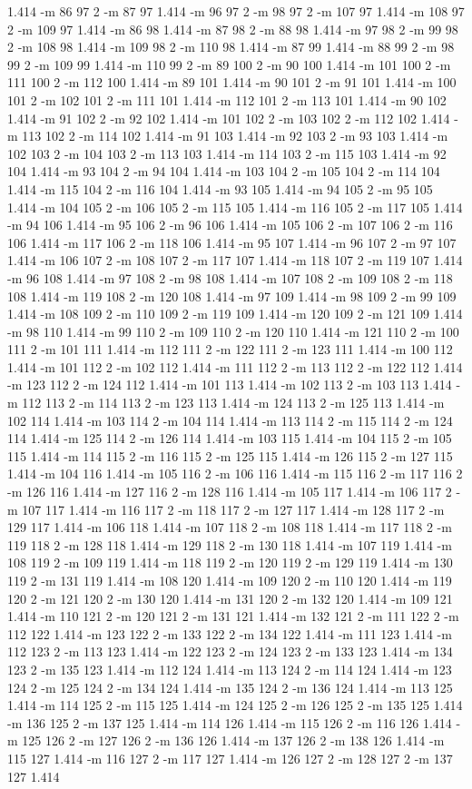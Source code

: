\documentclass[12pt]{article}
\begin{document}
1.414 -m 86 97 2 -m 87 97 1.414 -m 96 97 2 -m 98 97 2 -m 107 97 1.414 -m 108 97 2 -m 109 97 1.414 -m 86 98 1.414 -m 87 98 2 -m 88 98 1.414 -m 97 98 2 -m 99 98 2 -m 108 98 1.414 -m 109 98 2 -m 110 98 1.414 -m 87 99 1.414 -m 88 99 2 -m 98 99 2 -m 109 99 1.414 -m 110 99 2 -m 89 100 2 -m 90 100 1.414 -m 101 100 2 -m 111 100 2 -m 112 100 1.414 -m 89 101 1.414 -m 90 101 2 -m 91 101 1.414 -m 100 101 2 -m 102 101 2 -m 111 101 1.414 -m 112 101 2 -m 113 101 1.414 -m 90 102 1.414 -m 91 102 2 -m 92 102 1.414 -m 101 102 2 -m 103 102 2 -m 112 102 1.414 -m 113 102 2 -m 114 102 1.414 -m 91 103 1.414 -m 92 103 2 -m 93 103 1.414 -m 102 103 2 -m 104 103 2 -m 113 103 1.414 -m 114 103 2 -m 115 103 1.414 -m 92 104 1.414 -m 93 104 2 -m 94 104 1.414 -m 103 104 2 -m 105 104 2 -m 114 104 1.414 -m 115 104 2 -m 116 104 1.414 -m 93 105 1.414 -m 94 105 2 -m 95 105 1.414 -m 104 105 2 -m 106 105 2 -m 115 105 1.414 -m 116 105 2 -m 117 105 1.414 -m 94 106 1.414 -m 95 106 2 -m 96 106 1.414 -m 105 106 2 -m 107 106 2 -m 116 106 1.414 -m 117 106 2 -m 118 106 1.414 -m 95 107 1.414 -m 96 107 2 -m 97 107 1.414 -m 106 107 2 -m 108 107 2 -m 117 107 1.414 -m 118 107 2 -m 119 107 1.414 -m 96 108 1.414 -m 97 108 2 -m 98 108 1.414 -m 107 108 2 -m 109 108 2 -m 118 108 1.414 -m 119 108 2 -m 120 108 1.414 -m 97 109 1.414 -m 98 109 2 -m 99 109 1.414 -m 108 109 2 -m 110 109 2 -m 119 109 1.414 -m 120 109 2 -m 121 109 1.414 -m 98 110 1.414 -m 99 110 2 -m 109 110 2 -m 120 110 1.414 -m 121 110 2 -m 100 111 2 -m 101 111 1.414 -m 112 111 2 -m 122 111 2 -m 123 111 1.414 -m 100 112 1.414 -m 101 112 2 -m 102 112 1.414 -m 111 112 2 -m 113 112 2 -m 122 112 1.414 -m 123 112 2 -m 124 112 1.414 -m 101 113 1.414 -m 102 113 2 -m 103 113 1.414 -m 112 113 2 -m 114 113 2 -m 123 113 1.414 -m 124 113 2 -m 125 113 1.414 -m 102 114 1.414 -m 103 114 2 -m 104 114 1.414 -m 113 114 2 -m 115 114 2 -m 124 114 1.414 -m 125 114 2 -m 126 114 1.414 -m 103 115 1.414 -m 104 115 2 -m 105 115 1.414 -m 114 115 2 -m 116 115 2 -m 125 115 1.414 -m 126 115 2 -m 127 115 1.414 -m 104 116 1.414 -m 105 116 2 -m 106 116 1.414 -m 115 116 2 -m 117 116 2 -m 126 116 1.414 -m 127 116 2 -m 128 116 1.414 -m 105 117 1.414 -m 106 117 2 -m 107 117 1.414 -m 116 117 2 -m 118 117 2 -m 127 117 1.414 -m 128 117 2 -m 129 117 1.414 -m 106 118 1.414 -m 107 118 2 -m 108 118 1.414 -m 117 118 2 -m 119 118 2 -m 128 118 1.414 -m 129 118 2 -m 130 118 1.414 -m 107 119 1.414 -m 108 119 2 -m 109 119 1.414 -m 118 119 2 -m 120 119 2 -m 129 119 1.414 -m 130 119 2 -m 131 119 1.414 -m 108 120 1.414 -m 109 120 2 -m 110 120 1.414 -m 119 120 2 -m 121 120 2 -m 130 120 1.414 -m 131 120 2 -m 132 120 1.414 -m 109 121 1.414 -m 110 121 2 -m 120 121 2 -m 131 121 1.414 -m 132 121 2 -m 111 122 2 -m 112 122 1.414 -m 123 122 2 -m 133 122 2 -m 134 122 1.414 -m 111 123 1.414 -m 112 123 2 -m 113 123 1.414 -m 122 123 2 -m 124 123 2 -m 133 123 1.414 -m 134 123 2 -m 135 123 1.414 -m 112 124 1.414 -m 113 124 2 -m 114 124 1.414 -m 123 124 2 -m 125 124 2 -m 134 124 1.414 -m 135 124 2 -m 136 124 1.414 -m 113 125 1.414 -m 114 125 2 -m 115 125 1.414 -m 124 125 2 -m 126 125 2 -m 135 125 1.414 -m 136 125 2 -m 137 125 1.414 -m 114 126 1.414 -m 115 126 2 -m 116 126 1.414 -m 125 126 2 -m 127 126 2 -m 136 126 1.414 -m 137 126 2 -m 138 126 1.414 -m 115 127 1.414 -m 116 127 2 -m 117 127 1.414 -m 126 127 2 -m 128 127 2 -m 137 127 1.414 
\end{document}
